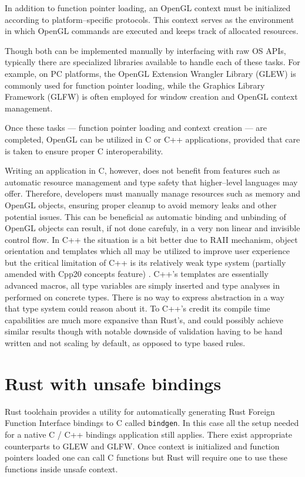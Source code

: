 In addition to function pointer loading, an OpenGL context must be initialized according to platform--specific protocols. 
This context serves as the environment in which OpenGL commands are executed and keeps track of allocated resources.

Though both can be implemented manually by interfacing with raw OS APIs, typically there are specialized libraries available to handle each of these tasks.
For example, on PC platforms, the OpenGL Extension Wrangler Library (GLEW) \cite{glewwebsite} is commonly used for function pointer loading, 
while the Graphics Library Framework (GLFW) \cite{glfwwebsite} is often employed for window creation and OpenGL context management.

Once these tasks --- function pointer loading and context creation --- are completed, OpenGL can be utilized in C or C++ applications, provided that care is taken to ensure proper C interoperability. 

Writing an application in C, however, does not benefit from features such as automatic resource management and type safety that higher--level languages may offer.
Therefore, developers must manually manage resources such as memory and OpenGL objects, ensuring proper cleanup to avoid memory leaks and other potential issues.
This can be beneficial as automatic binding and unbinding of OpenGL objects can result, if not done carefuly, in a very non linear and invisible control flow.
In C++ the situation is a bit better due to RAII mechanism, object orientation and templates which all may be utilized to improve user experience but the
critical limitation of C++ is its relatively weak type system (partially amended with Cpp20 concepts feature) \cite{cppref}.
C++'s templates are essentially advanced macros, all type variables are simply inserted and type analyses in performed on concrete types.
There is no way to express abstraction in a way that type system could reason about it.
To C++'s credit its compile time capabilities are much more expansive than Rust's, and could possibly achieve similar results though
with notable downside of validation having to be hand written and not scaling by default, as opposed to type based rules.

\section{Rust with unsafe bindings}

Rust toolchain provides a utility for automatically generating Rust Foreign Function Interface bindings to C called \texttt{bindgen}.
In this case all the setup needed for a native C / C++ bindings application still applies. There exist appropriate counterparts to GLEW and GLFW.
Once context is initialized and function pointers loaded one can call C functions but Rust will require one to use these functions inside unsafe context.

